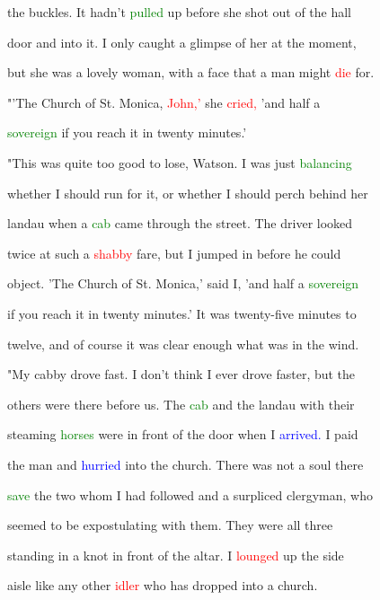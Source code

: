  the buckles. It hadn't \textcolor{green}{pulled} up before she \textcolor{BurntOrange}{shot} out of the hall

 door and into it. I only caught a glimpse of her at the moment,

 but she was a \textcolor{BurntOrange}{lovely} woman, with a face that a man might \textcolor{red}{die} for.



 "'The \textcolor{BurntOrange}{Church} of St. Monica, \textcolor{red}{John,'} she \textcolor{red}{cried,} 'and half a

 \textcolor{green}{sovereign} if you reach it in twenty minutes.'



 "This was quite too \textcolor{BurntOrange}{good} to \textcolor{BurntOrange}{lose,} Watson. I was just \textcolor{green}{balancing}

 whether I should run for it, or whether I should perch behind her

 landau when a \textcolor{green}{cab} came through the street. The driver looked

 twice at such a \textcolor{red}{shabby} fare, but I jumped in before he could

 object. 'The \textcolor{BurntOrange}{Church} of St. Monica,' said I, 'and half a \textcolor{green}{sovereign}

 if you reach it in twenty minutes.' It was twenty-five minutes to

 twelve, and of course it was clear enough what was in the wind.



 "My cabby drove fast. I don't think I ever drove faster, but the

 others were there before us. The \textcolor{green}{cab} and the landau with their

 steaming \textcolor{green}{horses} were in front of the door when I \textcolor{blue}{arrived.} I paid

 the man and \textcolor{blue}{hurried} into the \textcolor{BurntOrange}{church.} There was not a soul there

 \textcolor{green}{save} the two whom I had followed and a surpliced clergyman, who

 seemed to be expostulating with them. They were all three

 standing in a knot in front of the altar. I \textcolor{red}{lounged} up the side

 aisle like any other \textcolor{red}{idler} who has dropped into a \textcolor{BurntOrange}{church.}

